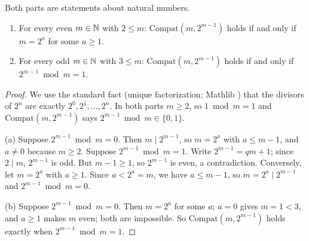 \begin{proposition}\label{ec:prop:parity}
Both parts are statements about natural numbers.
\begin{enumerate}[label=(\alph*)]
\item For every even $m\in\mathbb N$ with $2\le m$: $\mathrm{Compat}(m,2^{m-1})$ holds if and only if $m=2^a$ for some
  $a\ge1$.
\item For every odd $m\in\mathbb N$ with $3\le m$: $\mathrm{Compat}(m,2^{m-1})$ holds if and only if $2^{m-1}\bmod m=1$.
\end{enumerate}
\end{proposition}

\begin{proof}
We use the standard fact (unique factorization; Mathlib ) that the divisors of $2^n$ are
exactly $2^0,2^1,\dots,2^n$. In both parts $m\ge2$, so $1\bmod m=1$ and $\mathrm{Compat}(m,2^{m-1})$ says
$2^{m-1}\bmod m\in\{0,1\}$.

(a) Suppose $2^{m-1}\bmod m=0$. Then $m\mid2^{m-1}$, so $m=2^a$ with $a\le m-1$, and $a\ne0$ because $m\ge2$. Suppose
$2^{m-1}\bmod m=1$. Write $2^{m-1}=qm+1$; since $2\mid m$, $2^{m-1}$ is odd. But $m-1\ge1$, so $2^{m-1}$ is even, a
contradiction. Conversely, let $m=2^a$ with $a\ge1$. Since $a<2^a=m$, we have $a\le m-1$, so $m=2^a\mid2^{m-1}$ and
$2^{m-1}\bmod m=0$.

(b) Suppose $2^{m-1}\bmod m=0$. Then $m=2^a$ for some $a$; $a=0$ gives $m=1<3$, and $a\ge1$ makes $m$ even; both are
impossible. So $\mathrm{Compat}(m,2^{m-1})$ holds exactly when $2^{m-1}\bmod m=1$.
\end{proof}

